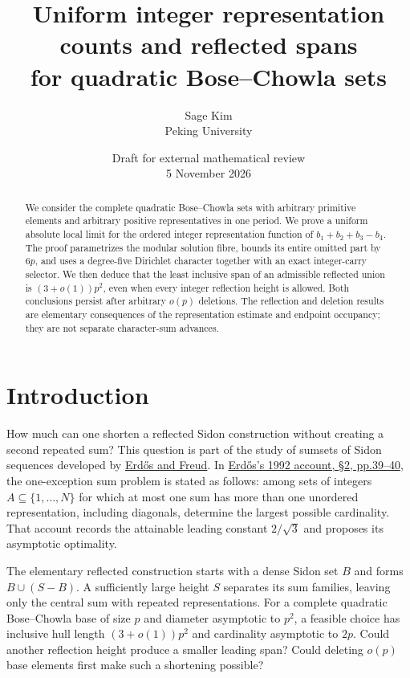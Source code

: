 \documentclass[11pt,a4paper]{article}
\title{Uniform integer representation counts and reflected spans\\
for quadratic Bose--Chowla sets}
\author{Sage Kim\\Peking University}
\date{Draft for external mathematical review\\5 November 2026}
\begin{document}
\maketitle
\begin{abstract}

We consider the complete quadratic Bose–Chowla sets with arbitrary
primitive elements and arbitrary positive representatives in one period.
We prove a uniform absolute local limit for the ordered integer
representation function of $b_1+b_2+b_3-b_4$. The proof parametrizes
the modular solution fibre, bounds its entire omitted part by $6p$,
and uses a degree-five Dirichlet character together with an exact
integer-carry selector. We then deduce that the least inclusive span
of an admissible reflected union is $(3+o(1))p^2$, even when every
integer reflection height is allowed. Both conclusions persist after
arbitrary $o(p)$ deletions. The reflection and deletion results are
elementary consequences of the representation estimate and endpoint
occupancy; they are not separate character-sum advances.

\end{abstract}

\section{Introduction}\label{introduction}

How much can one shorten a reflected Sidon construction without creating a second repeated sum? This question is part of the study of sumsets of Sidon sequences developed by \href{https://www.sciencedirect.com/science/article/pii/0022314X9190083N}{Erdős and Freud}. In \href{https://hrj.episciences.org/125/pdf}{Erdős's 1992 account, §2, pp.39--40}, the one-exception sum problem is stated as follows: among sets of integers \(A\subseteq\{1,\ldots,N\}\) for which at most one sum has more than one unordered representation, including diagonals, determine the largest possible cardinality. That account records the attainable leading constant \(2/\sqrt3\) and proposes its asymptotic optimality.

The elementary reflected construction starts with a dense Sidon set \(B\) and forms \(B\cup(S-B)\). A sufficiently large height \(S\) separates its sum families, leaving only the central sum with repeated representations. For a complete quadratic Bose--Chowla base of size \(p\) and diameter asymptotic to \(p^2\), a feasible choice has inclusive hull length \((3+o(1))p^2\) and cardinality asymptotic to \(2p\). Could another reflection height produce a smaller leading span? Could deleting \(o(p)\) base elements first make such a shortening possible?
\end{document}

